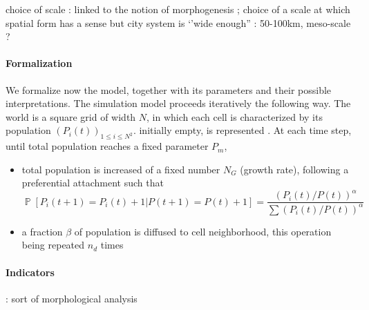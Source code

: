 \documentclass[10pt,letterpaper,draft]{article}
\DeclareMathOperator{\Proba}{\mathbb{P}}
\newcommand{\Pb}[1]{\ensuremath{\Proba\!\left[#1\right]}}
\begin{document}
choice of scale : linked to the notion of morphogenesis ; choice of a scale at which spatial form has a sense but city system is ‘’wide enough” : 50-100km, meso-scale ?




\paragraph*{Formalization}



We formalize now the model, together with its parameters and their possible interpretations. The simulation model proceeds iteratively the following way. The world is a square grid of width $N$, in which each cell is characterized by its population $(P_i(t))_{1\leq i\leq N^2}$. initially empty, is represented . At each time step, until total population reaches a fixed parameter $P_m$,

\begin{itemize}
\item total population is increased of a fixed number $N_G$ (growth rate), following a preferential attachment such that 
\begin{equation}
\Pb{P_i(t+1)=P_i(t)+1|P(t+1)=P(t)+1}=\frac{(P_i(t)/P(t))^{\alpha}}{\sum(P_i(t)/P(t))^{\alpha}}
\end{equation}
\item a fraction $\beta$ of population is diffused to cell neighborhood, this operation being repeated $n_d$ times
\end{itemize}





\paragraph*{Indicators}


\cite{guerois2008built} : sort of morphological analysis



\end{document}
